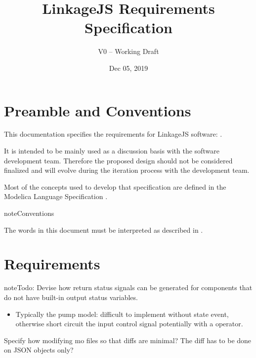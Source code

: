 \documentclass[letterpaper,10pt, openany,english]{sphinxmanual}
\title{LinkageJS Requirements Specification}
\date{Dec 05, 2019}
\author{V0 -- Working Draft}
\begin{document}
\pagestyle{empty}
\sphinxmaketitle
\pagestyle{plain}
\sphinxtableofcontents
\pagestyle{normal}
\label{\detokenize{index::doc}}




\pagestyle{plain}


\chapter{Preamble and Conventions}
\label{\detokenize{preamble:preamble-and-conventions}}\label{\detokenize{preamble::doc}}
This documentation specifies the requirements for LinkageJS software: .

It is intended to be mainly used as a discussion basis with the software development team.
Therefore the proposed design should not be considered finalized and will evolve during the iteration process with the development team.

Most of the concepts used to develop that specification are defined in the Modelica Language Specification .

\begin{sphinxadmonition}{note}{Conventions}

The words  in this document must be interpreted as described in .
\end{sphinxadmonition}


\chapter{Requirements}
\label{\detokenize{requirements:requirements}}\label{\detokenize{requirements:sec-requirements}}\label{\detokenize{requirements::doc}}
\begin{sphinxadmonition}{note}{\label{\detokenize{requirements:id1}}Todo:}
Devise how return status signals can be generated for components that do not have built-in output status variables.
\begin{itemize}
\item {} 
Typically the pump model: difficult to implement without state event, otherwise short circuit the input control signal potentially with a  operator.

\end{itemize}

Specify how modifying mo files so that diffs are minimal? The diff has to be done on JSON objects only?
\end{sphinxadmonition}
\end{document}
